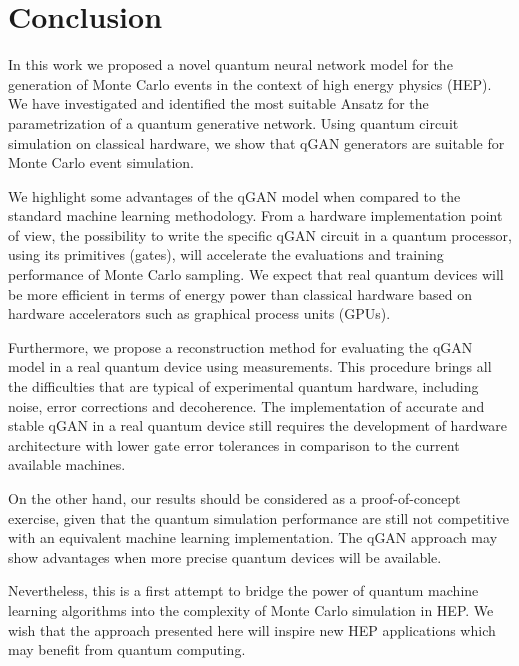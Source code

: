 \documentclass[twocolumn,preprintnumbers,superscriptaddress]{revtex4-2}
\begin{document}
\section{Conclusion}
\label{sec:conclusion}

In this work we proposed a novel quantum neural network model for the generation
of Monte Carlo events in the context of high energy physics (HEP). We have
investigated and identified the most suitable Ansatz for the parametrization of
a quantum generative network. Using quantum circuit simulation on classical
hardware, we show that qGAN generators are suitable for Monte Carlo event
simulation.

We highlight some advantages of the qGAN model when compared to the standard
machine learning methodology. From a hardware implementation point of view, the
possibility to write the specific qGAN circuit in a quantum processor, using its
primitives (gates), will accelerate the evaluations and training performance of
Monte Carlo sampling. We expect that real quantum devices will be more efficient
in terms of energy power than classical hardware based on hardware accelerators
such as graphical process units (GPUs).

Furthermore, we propose a reconstruction method for evaluating the qGAN model in
a real quantum device using measurements. This procedure brings all the
difficulties that are typical of experimental quantum hardware, including noise,
error corrections and decoherence. The implementation of accurate and stable
qGAN in a real quantum device still requires the development of hardware
architecture with lower gate error tolerances in comparison to the current
available machines.

On the other hand, our results should be considered as a proof-of-concept
exercise, given that the quantum simulation performance are still not
competitive with an equivalent machine learning implementation. The qGAN
approach may show advantages when more precise quantum devices will be
available.

Nevertheless, this is a first attempt to bridge the power of quantum machine
learning algorithms into the complexity of Monte Carlo simulation in HEP. We
wish that the approach presented here will inspire new HEP applications which
may benefit from quantum computing.
\end{document}

